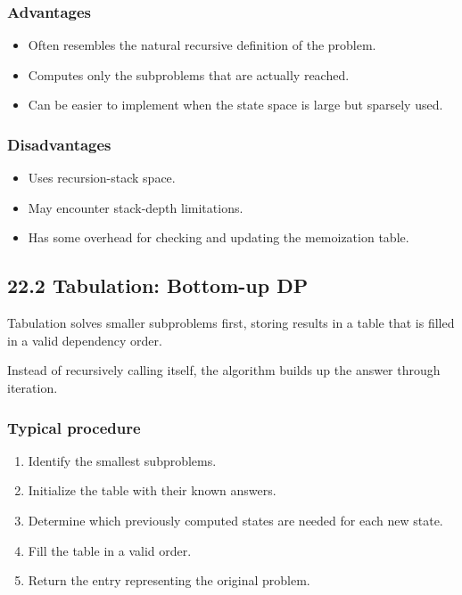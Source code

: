 \subsubsection{Advantages}

\begin{itemize}
    \item Often resembles the natural recursive definition of the problem.
    \item Computes only the subproblems that are actually reached.
    \item Can be easier to implement when the state space is large but sparsely used.
\end{itemize}

\subsubsection{Disadvantages}

\begin{itemize}
    \item Uses recursion-stack space.
    \item May encounter stack-depth limitations.
    \item Has some overhead for checking and updating the memoization table.
\end{itemize}

\subsection{22.2 Tabulation: Bottom-up DP}

Tabulation solves smaller subproblems first, storing results in a table that is filled in a valid dependency order.

Instead of recursively calling itself, the algorithm builds up the answer through iteration.

\subsubsection{Typical procedure}

\begin{enumerate}
    \item Identify the smallest subproblems.
    \item Initialize the table with their known answers.
    \item Determine which previously computed states are needed for each new state.
    \item Fill the table in a valid order.
    \item Return the entry representing the original problem.
\end{enumerate}

